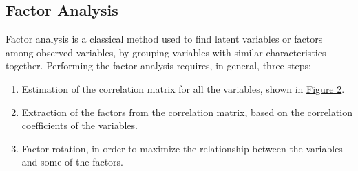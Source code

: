 \subsection{Factor Analysis}

Factor analysis is a classical method used to find latent variables or factors among observed variables, by grouping variables with similar characteristics together. Performing the factor analysis requires, in general, three steps:
\begin{enumerate}
  \item Estimation of the correlation matrix for all the variables, shown in \hyperref[fig:figure_2]{Figure 2}.
  \item Extraction of the factors from the correlation matrix, based on the correlation coefficients of the variables.
  \item Factor rotation, in order to maximize the relationship between the variables and some of the factors.
\end{enumerate}

